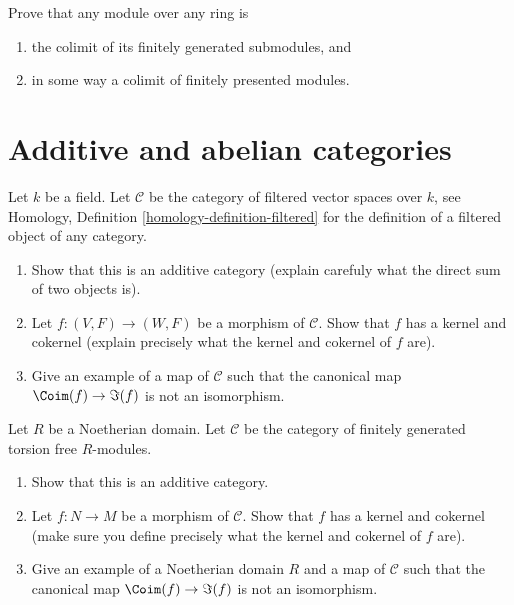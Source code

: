 \begin{exercise}
\label{exercise-colimit-modules}
Prove that any module over any ring is
\begin{enumerate}
\item the colimit of its finitely generated submodules, and
\item in some way a colimit of finitely presented modules.
\end{enumerate}
\end{exercise}





\section{Additive and abelian categories}
\label{section-additive}

\begin{exercise}
\label{exercise-filtered-vector-spaces}
Let $k$ be a field. Let $\mathcal{C}$ be the category of filtered vector
spaces over $k$, see
Homology, Definition \ref{homology-definition-filtered}
for the definition of a filtered object of any category.
\begin{enumerate}
\item Show that this is an additive category (explain carefuly what the
direct sum of two objects is).
\item Let $f : (V, F) \to (W, F)$ be a morphism of $\mathcal{C}$.
Show that $f$ has a kernel and cokernel (explain precisely
what the kernel and cokernel of $f$ are).
\item Give an example of a map of $\mathcal{C}$ such that
the canonical map $\Coim(f) \to \Im(f)$ is not an isomorphism.
\end{enumerate}
\end{exercise}

\begin{exercise}
\label{exercise-torsion-free}
Let $R$ be a Noetherian domain. Let $\mathcal{C}$ be the category of
finitely generated torsion free $R$-modules.
\begin{enumerate}
\item Show that this is an additive category.
\item Let $f : N \to M$ be a morphism of $\mathcal{C}$.
Show that $f$ has a kernel and cokernel (make sure you define precisely
what the kernel and cokernel of $f$ are).
\item Give an example of a Noetherian domain $R$ and a map of
$\mathcal{C}$ such that the canonical map $\Coim(f) \to \Im(f)$
is not an isomorphism.
\end{enumerate}
\end{exercise}

